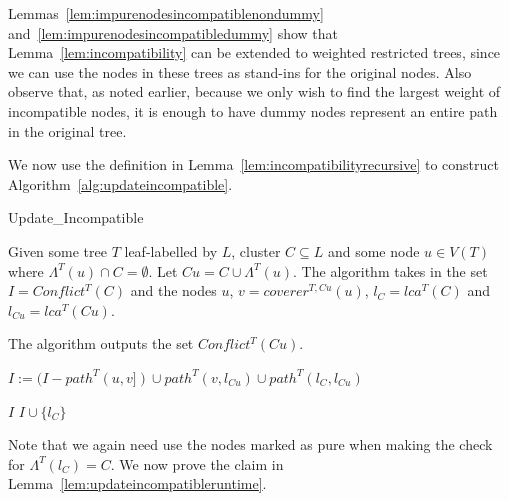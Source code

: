 \documentclass[final,1p,times]{elsarticle}
\newcommand{\leafset}{\Lambda}
\begin{document}
    Lemmas~\ref{lem:impurenodesincompatiblenondummy} and~\ref{lem:impurenodesincompatibledummy} show that Lemma~\ref{lem:incompatibility} can be extended to weighted restricted trees, since we can use the nodes in these trees as stand-ins for the original nodes. Also observe that, as noted earlier, because we only wish to find the largest weight of incompatible nodes, it is enough to have dummy nodes represent an entire path in the original tree.

    We now use the definition in Lemma~\ref{lem:incompatibilityrecursive} to construct Algorithm~\ref{alg:updateincompatible}.

    \begin{algorithm}
        \caption{Update\_Incompatible}
        \label{alg:updateincompatible}

        \begin{algorithmic}[1]
            \Input Given some tree $T$ leaf-labelled by $L$, cluster $C \subseteq L$ and some node $u \in V(T)$ where $\leafset^{T}(u) \cap C = \emptyset$. Let $Cu = C \cup \leafset^{T}(u)$. The algorithm takes in the set $I = Conflict^{T}(C)$ and the nodes $u$, $v = coverer^{T, Cu}(u)$, $l_C = lca^{T}(C)$ and $l_{Cu} = lca^{T}(Cu)$.

            \Output The algorithm outputs the set $Conflict^{T}(Cu)$.

            \State $I := (I - path^{T}(u, v]) \cup path^{T}(v, l_{Cu}) \cup path^{T}(l_C, l_{Cu})$

            \If{($\leafset^{T}(l_C) = C$ and $l_C$ is pure) or $l_C = l_{Cu}$}
                \State \Return $I$
            \Else
                \State \Return $I \cup \{l_C\}$
            \EndIf
        \end{algorithmic}
    \end{algorithm}

    Note that we again need use the nodes marked as pure when making the check for $\leafset^{T}(l_C) = C$. We now prove the claim in Lemma~\ref{lem:updateincompatibleruntime}.
\end{document}
